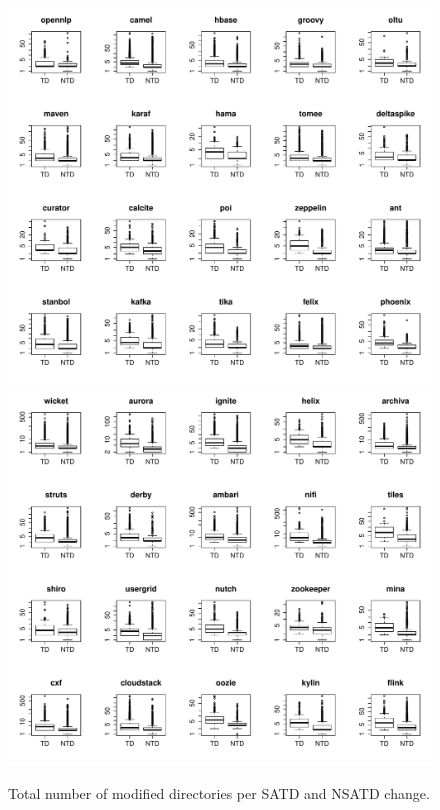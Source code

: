 \begin{figure}[tb]
	\centering
	\includegraphics[width=120mm]{figures/chapter4/rq3_td_nd_logged_1}
	\includegraphics[width=120mm]{figures/chapter4/rq3_td_nd_logged_2}
	\caption{Total number of modified directories per SATD and NSATD change.}
	\label{figure:total_nd_changed_td_vs_ntd}
\end{figure}




